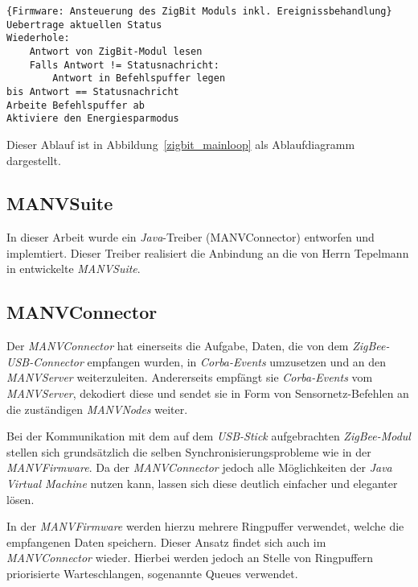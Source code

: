 \begin{lstlisting}{Firmware: Ansteuerung des ZigBit Moduls inkl. Ereignissbehandlung}
Uebertrage aktuellen Status
Wiederhole:
    Antwort von ZigBit-Modul lesen
    Falls Antwort != Statusnachricht:
        Antwort in Befehlspuffer legen
bis Antwort == Statusnachricht    
Arbeite Befehlspuffer ab
Aktiviere den Energiesparmodus
\end{lstlisting}

Dieser Ablauf ist in Abbildung~\ref{zigbit_mainloop} als Ablaufdiagramm dargestellt.

\subsection{MANVSuite}

In dieser Arbeit wurde ein \emph{Java}-Treiber (MANVConnector) entworfen und implemtiert. Dieser Treiber realisiert die 
Anbindung an die von Herrn Tepelmann in \cite{Jan} entwickelte \emph{MANVSuite}. 


\subsection{MANVConnector}


Der \emph{MANVConnector} hat einerseits die Aufgabe, Daten, die von dem \emph{ZigBee-USB-Connector} empfangen wurden, in 
\emph{Corba-Events} umzusetzen und an den \emph{MANVServer} weiterzuleiten. Andererseits empfängt sie 
\emph{Corba-Events} vom \emph{MANVServer}, dekodiert diese und sendet sie in Form von Sensornetz-Befehlen an die 
zuständigen \emph{MANVNodes} weiter.

Bei der Kommunikation mit dem auf dem \emph{USB-Stick} aufgebrachten \emph{ZigBee-Modul} stellen sich grundsätzlich 
die selben Synchronisierungsprobleme wie in der \emph{MANVFirmware}. Da der \emph{MANVConnector} jedoch alle 
Möglichkeiten der \emph{Java Virtual Machine} nutzen kann, lassen sich diese deutlich einfacher und eleganter lösen. 

In der \emph{MANVFirmware} werden hierzu mehrere Ringpuffer verwendet, welche die empfangenen Daten speichern. Dieser 
Ansatz findet sich auch im \emph{MANVConnector} wieder. Hierbei werden jedoch an Stelle von Ringpuffern priorisierte Warteschlangen, 
sogenannte Queues verwendet. 

